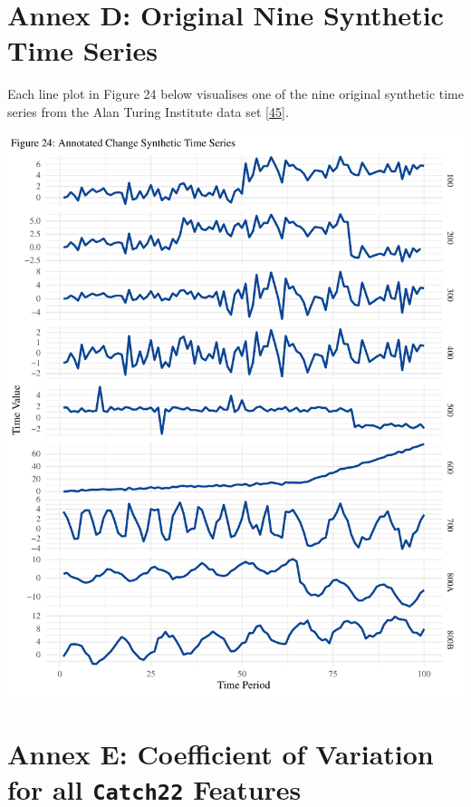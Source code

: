 \documentclass{article}
\begin{document}
\newpage

\hypertarget{annex-d-original-nine-synthetic-time-series}{%
\section{Annex D: Original Nine Synthetic Time
Series}\label{annex-d-original-nine-synthetic-time-series}}

\vspace{-0.4cm}

Each line plot in Figure 24 below visualises one of the nine original
synthetic time series from the Alan Turing Institute data set
\protect\hyperlink{ref-ATIChangePoint}{{[}45{]}}.

\includegraphics{210431461_CSC8639_Dissertation_files/figure-latex/unnamed-chunk-20-1.pdf}

\newpage

\hypertarget{annex-e-coefficient-of-variation-for-all-catch22-features}{%
\section{\texorpdfstring{Annex E: Coefficient of Variation for all
\texttt{Catch22}
Features}{Annex E: Coefficient of Variation for all Catch22 Features}}\label{annex-e-coefficient-of-variation-for-all-catch22-features}}
\end{document}
